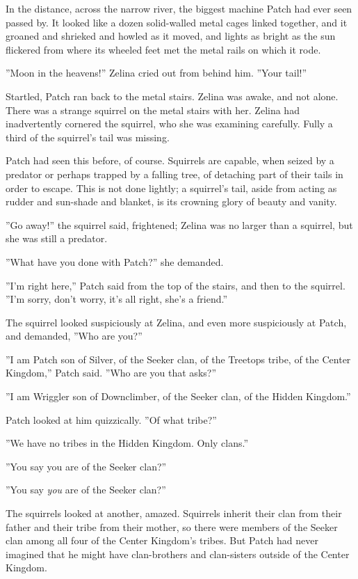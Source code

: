 \documentclass[12pt]{book}
\begin{document}
In the distance, across the narrow river, the biggest machine Patch had ever seen passed by. It looked like a dozen solid-walled metal cages linked together, and it groaned and shrieked and howled as it moved, and lights as bright as the sun flickered from where its wheeled feet met the metal rails on which it rode.\par
 ''Moon in the heavens!'' Zelina cried out from behind him. ''Your tail!'' \par
 Startled, Patch ran back to the metal stairs. Zelina was awake, and not alone. There was a strange squirrel on the metal stairs with her. Zelina had inadvertently cornered the squirrel, who she was examining carefully. Fully a third of the squirrel's tail was missing.\par
Patch had seen this before, of course. Squirrels are capable, when seized by a predator or perhaps trapped by a falling tree, of detaching part of their tails in order to escape. This is not done lightly; a squirrel's tail, aside from acting as rudder and sun-shade and blanket, is its crowning glory of beauty and vanity.\par
''Go away!'' the squirrel said, frightened; Zelina was no larger than a squirrel, but she was still a predator.\par
''What have you done with Patch?'' she demanded.\par
''I'm right here,'' Patch said from the top of the stairs, and then to the squirrel. ''I'm sorry, don't worry, it's all right, she's a friend.''\par
The squirrel looked suspiciously at Zelina, and even more suspiciously at Patch, and demanded, ''Who are you?''\par
 ''I am Patch son of Silver, of the Seeker clan, of the Treetops tribe, of the Center Kingdom,'' Patch said. ''Who are you that asks?''\par
 ''I am Wriggler son of Downclimber, of the Seeker clan, of the Hidden Kingdom.''\par
 Patch looked at him quizzically. ''Of what tribe?''\par
 ''We have no tribes in the Hidden Kingdom. Only clans.''\par
 ''You say you are of the Seeker clan?''\par
 ''You say {\it you} are of the Seeker clan?''\par
 The squirrels looked at another, amazed. Squirrels inherit their clan from their father and their tribe from their mother, so there were members of the Seeker clan among all four of the Center Kingdom's tribes. But Patch had never imagined that he might have clan-brothers and clan-sisters outside of the Center Kingdom.\par
\end{document}
